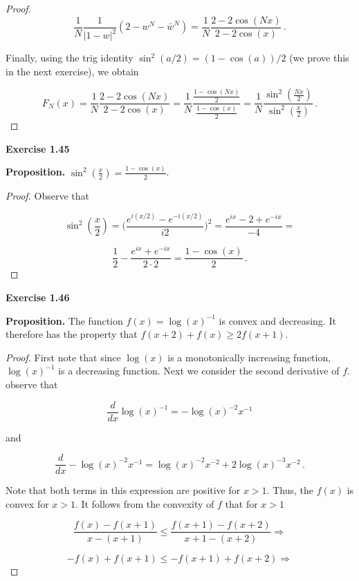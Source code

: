 \documentclass[a4paper]{article}
\newcommand {\m} {\cdot}
\numberwithin{equation}{section}
\begin{document}
\begin{description}
\begin{proof}
$$\frac{1}{N}\frac{1}{|1-w|^2}(2-w^N-\bar{w}^N)=\frac{1}{N}\frac{2-2\cos(Nx)}{2-2\cos(x)}\,.$$

Finally, using the trig identity $\sin^2(a/2) = (1-\cos(a))/2$ (we prove this in the next exercise), we obtain

$$F_N(x) = \frac{1}{N}\frac{2-2\cos(Nx)}{2-2\cos(x)} = \frac{1}{N}\frac{\frac{1-\cos(Nx)}{2}}{\frac{1-\cos(x)}{2}} = \frac{1}{N}\frac{\sin^2(\frac{Nx}{2})}{\sin^2(\frac{x}{2})}\,.$$

	
\end{proof}

\item \textbf{Exercise 1.45}

\item \textbf{Proposition.} $\sin^2(\frac{x}{2}) = \frac{1-\cos(x)}{2}$.

\begin{proof} Observe that 

$$\sin^2(\frac{x}{2}) = \Big(\frac{e^{i(x/2)} - e^{-i(x/2)}}{i2}\Big)^2 = \frac{e^{ix} - 2 + e^{-ix}}{-4} = $$

$$\frac{1}{2} - \frac{e^{ix} + e^{-ix}}{2\m2} = \frac{1-\cos(x)}{2}\,.$$

\end{proof}


\item \textbf{Exercise 1.46}

\item \textbf{Proposition.} The function $f(x) = \log(x)^{-1}$ is convex and decreasing. It therefore has the property that $f(x+2)+f(x) \geq 2f(x+1)$.

\begin{proof} First note that since $\log(x)$ is a monotonically increasing function, $\log(x)^{-1}$ is a decreasing function. Next we consider the second derivative of $f$. observe that

$$\frac{d}{dx} \log(x)^{-1} = -\log(x)^{-2}x^{-1}$$

and 

$$\frac{d}{dx} -\log(x)^{-2}x^{-1} = \log(x)^{-2}x^{-2} + 2\log(x)^{-3}x^{-2}\,.$$

Note that both terms in this expression are positive for $x>1$. Thus, the $f(x)$ is convex for $x >1$. It follows from the convexity of $f$ that for $x > 1$

$$\frac{f(x) - f(x+1)}{x - (x+1)} \leq \frac{f(x+1) - f(x+2)}{x+1 - (x+2)} \Rightarrow$$

$$-f(x) + f(x+1) \leq -f(x+1) + f(x+2) \Rightarrow$$


\end{proof}
\end{description}
\end{document}
